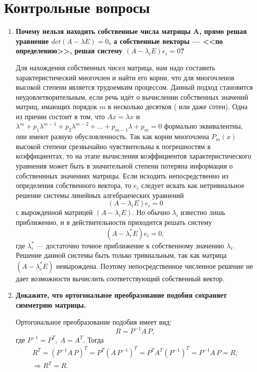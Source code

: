 \documentclass[12pt, a4paper]{article}
\begin{document}
    \section{Контрольные вопросы}
    \begin{enumerate}
    \item {\bf Почему нельзя находить собственные числа матрицы A, прямо решая уравнение $det(A - \lambda E) = 0$, а собственные векторы --- <<по определению>>, решая систему $(A - \lambda_i E)e_i = 0$? }
    
    Для нахождения собственных чисел матрица, нам надо составить характеристический многочлен и найти его корни, что для многочленов высокой степени является трудоемким процессом. Данный подход становится неудовлетворительным, если речь идёт о вычислении собственных значений матриц, имающих порядок $m$ в несколько десятков ( или даже сотен). Одна из причин состоит в том, что $Ax=\lambda x$ и $\lambda^{m}+p_{1}\lambda^{m-1}+p_{2}\lambda^{m-2}+\ldots+p_{m-1}\lambda + p_{m}=0$ формально эквивалентны, они имеют разную обусловленность. Так как корни многочлена $P_{m}(x)$ высокой степени срезвычайно чувствительны к погрешностям в коэффициентах, то на этапе вычисления коэффициентов характеристического уравнения может быть в значительной степени потеряна информация о собственнных значениях матрицы. Если исходить непосредственно из определения собственного вектора, то $ e_{i} $ следует искать как нетривиальное решение системы линейных алгебраических уравнений 
	\[ (A - \lambda_{i} E) e_{i} = 0 \]
	с вырожденной матрицей $ (A - \lambda_{i} E) $. Но обычно $ \lambda_{i} $ известно лишь приближенно, и в действительности приходится решать систему 
	\[ (A - \lambda_{i}^{\ast} E) e_{i} = 0, \]
	где $ \lambda_{i}^{\ast} $ --- достаточно точное приближение к собственному значению $ \lambda_{i} $. Решение данной системы быть только тривиальным, так как матрица $ (A - \lambda_{i}^{\ast} E) $ невырождена. Поэтому непосредственное численное решение не дает возможности вычислить соответствующий собственный вектор.
    
    \newpage

    \item {\bf Докажите, что ортогональное преобразование подобия сохраняет симметрию матрицы. }
    
    Ортогональное преобразование подобия имеет вид:
	\[ R = P^{-1} A \, P, \]
	где $ P^{-1} = P^{T}, \: A = A^{T} $. Тогда 
	\begin{gather*}
		R^{T} = \left( P^{-1} A \, P \right)^{T} = P^{T} \left( A \, P^{-1} \right)^{T} = P^{T} A^{T} \left( P^{-1} \right)^{T} = P^{-1} A \, P = R, \\
		\Longrightarrow R^{T} = R.
	\end{gather*}



\end{enumerate}
\end{document}
